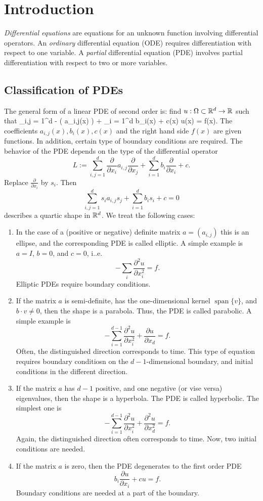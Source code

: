 \chapter{Introduction}
%
{\em Differential equations} are equations for an unknown function
involving differential operators. An {\em ordinary} differential
equation (ODE) requires differentiation with respect to one variable. A {\em
partial} differential equation (PDE) involves partial differentiation with
respect to two or more variables.

\section{Classification of PDEs}
%
The general form of a linear PDE of second order is: find $u : \Omega \subset {\mathbb R}^d \rightarrow {\mathbb R}$ such that
\beq \label{general_pde}
\sum_{i,j = 1}^d 
- \big( a_{i,j}(x)   \big) + 
\sum_{i = 1}^d 
b_{i}(x)   +  c(x) u(x) = f(x).
\eeq
%
The coefficients $a_{i,j}(x), b_i(x), c(x)$ and the right hand side $f(x)$ are
given functions. In addition, certain type of boundary conditions are
required. The behavior of the PDE depends on the type of the
differential operator
$$
L := 
\sum_{i,j = 1}^d 
\frac{\partial}{\partial x_i} a_{i,j} \frac{\partial}{\partial x_j}   + 
\sum_{i = 1}^d 
b_{i} \frac{\partial}{\partial x_i}   +  c.
$$
Replace $\frac{\partial}{\partial x_i}$ by $s_i$. Then
$$
\sum_{i,j = 1}^d s_i a_{i,j} s_j +  \sum_{i = 1}^d  b_{i} s_i  +  c = 0
$$
%
describes a quartic shape in ${\mathbb R}^d$. We treat the following cases:
\begin{enumerate}
\item
In the case of a (positive or negative) definite matrix $a = (a_{i,j})$ this is an
ellipse, and the corresponding PDE is called elliptic. A simple example is
$a = I$, $b = 0$, and $c = 0$, i..e.
$$
- \sum_i \frac{\partial^2 u}{\partial x_i^2} = f.
$$
Elliptic PDEs require boundary conditions.
\item
If the matrix $a$ is semi-definite, has the one-dimensional kernel $\operatorname{span} \{v \}$, and $b \cdot v \neq 0$, then the shape is a parabola. Thus, the PDE is called parabolic. A simple example is
$$
- \sum_{i=1}^{d-1} \frac{\partial^2 u}{\partial x_i^2} + \frac{\partial u}{\partial x_d} = f.
$$
Often, the distinguished direction corresponds to time. This type of equation requires boundary conditiosn on the $d-1$-dimensional boundary, and initial conditions in the different direction.
\item
If the matrix $a$ has $d-1$ positive, and one negative (or vise versa) eigenvalues, then the shape is a hyperbola. The PDE is called hyperbolic. The simplest one is
$$
- \sum_{i=1}^{d-1} \frac{\partial^2 u}{\partial x_i^2} + \frac{\partial^2 u}{\partial x_d^2} = f.
$$
Again, the distinguished direction often corresponds to time. Now, two initial conditions are needed.
\item
If the matrix $a$ is zero, then the PDE degenerates to the first order PDE
$$
b_{i} \frac{\partial u}{\partial x_i} +  c u = f.
$$
Boundary conditions are needed at a part of the boundary.
\end{enumerate}
